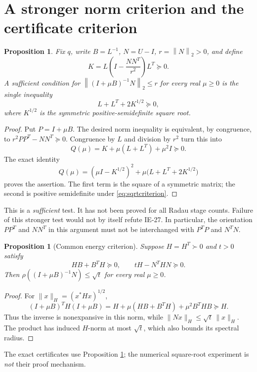 \documentclass[11pt,letterpaper]{article}
\newtheorem{proposition}[theorem]{Proposition}
\newcommand{\norm}[1]{\left\|#1\right\|_2}
\begin{document}
\section{A stronger norm criterion and the certificate criterion}
\begin{proposition}\label{prop:sqrt}
Fix $q$, write $B=L^{-1}$, $N=U-I$, $r=\norm{N}>0$, and define
\[
 K=L\left(I-\frac{NN^T}{r^2}\right)L^T\succeq0.
\]
A sufficient condition for $\norm{(I+\mu B)^{-1}N}\le r$ for every real
$\mu\ge0$ is the single inequality
\begin{equation}\label{eq:sqrtcriterion}
 L+L^T+2K^{1/2}\succeq0,
\end{equation}
where $K^{1/2}$ is the symmetric positive-semidefinite square root.
\end{proposition}
\begin{proof}
Put $P=I+\mu B$. The desired norm inequality is equivalent, by congruence,
to $r^2PP^T-NN^T\succeq0$. Congruence by $L$ and division by $r^2$
turn this into
\[
 Q(\mu)=K+\mu(L+L^T)+\mu^2 I\succeq0.
\]
The exact identity
\[
 Q(\mu)=(\mu I-K^{1/2})^2+
             \mu\bigl(L+L^T+2K^{1/2}\bigr)
\]
proves the assertion. The first term is the square of a symmetric matrix;
the second is positive semidefinite under \eqref{eq:sqrtcriterion}.
\end{proof}
This is a \emph{sufficient} test. It has not been proved for all Radau
stage counts. Failure of this stronger test would not by itself refute
IE-27. In particular, the orientation $PP^T$ and $NN^T$ in this argument
must not be interchanged with $P^TP$ and $N^TN$.

\begin{proposition}[Common energy criterion]\label{prop:energy}
Suppose $H=H^T\succ0$ and $t>0$ satisfy
\[
 HB+B^TH\succeq0,\qquad tH-N^THN\succeq0.
\]
Then $\rho((I+\mu B)^{-1}N)\le\sqrt t$ for every real $\mu\ge0$.
\end{proposition}
\begin{proof}
For $\|x\|_H=(x^*Hx)^{1/2}$,
\[
 (I+\mu B)^TH(I+\mu B)
 =H+\mu(HB+B^TH)+\mu^2B^THB\succeq H.
\]
Thus the inverse is nonexpansive in this norm, while
$\|Nx\|_H\le\sqrt t\,\|x\|_H$. The product has induced
$H$-norm at most $\sqrt t$, which also bounds its spectral radius.
\end{proof}
The exact certificates use Proposition \ref{prop:energy}; the numerical
square-root experiment is \emph{not} their proof mechanism.

\newpage
\end{document}
